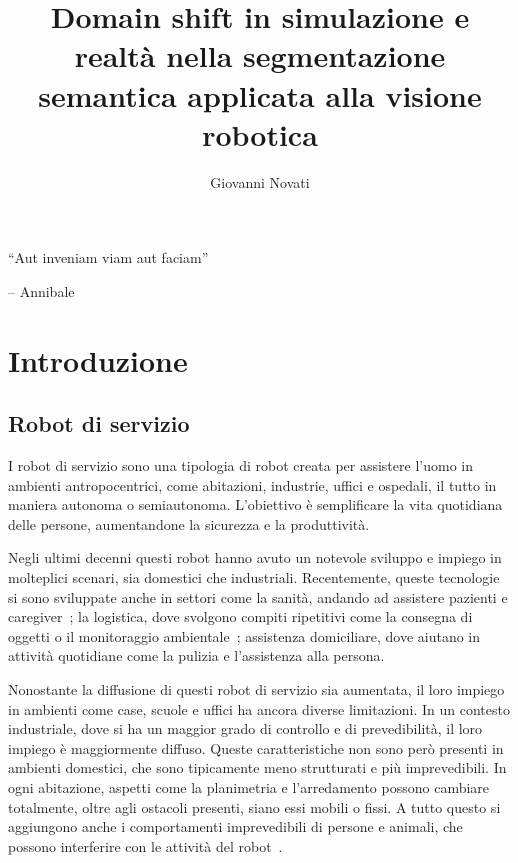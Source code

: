 \documentclass[12pt]{report}
\title{Domain shift in simulazione e realtà nella segmentazione semantica applicata alla visione robotica}
\author{Giovanni Novati}
\begin{document}
\makefrontpage

{\raggedleft \large \sl
	
	\vspace{2cm}
	
	``Aut inveniam viam aut faciam''
	
	\bigskip
	
	\--- Annibale\\}

\beforepreface

\afterpreface

\chapter{Introduzione}
\label{cap:introduzione}

\section{Robot di servizio}
\label{sec:robot_servizio}

I robot di servizio sono una tipologia di robot creata per assistere l'uomo in ambienti antropocentrici, come abitazioni, industrie, uffici e ospedali, il tutto in maniera autonoma o semiautonoma. L'obiettivo è semplificare la vita quotidiana delle persone, aumentandone la sicurezza e la produttività.

Negli ultimi decenni questi robot hanno avuto un notevole sviluppo e impiego in molteplici scenari, sia domestici che industriali. Recentemente, queste tecnologie si sono sviluppate anche in settori come la sanità, andando ad assistere pazienti e caregiver~\cite{robotics10010047}; la logistica, dove svolgono compiti ripetitivi come la consegna di oggetti o il monitoraggio ambientale~\cite{fragapane2021405}; assistenza domiciliare, dove aiutano in attività quotidiane come la pulizia e l'assistenza alla persona.

Nonostante la diffusione di questi robot di servizio sia aumentata, il loro impiego in ambienti come case, scuole e uffici ha ancora diverse limitazioni. In un contesto industriale, dove si ha un maggior grado di controllo e di prevedibilità, il loro impiego è maggiormente diffuso. Queste caratteristiche non sono però presenti in ambienti domestici, che sono tipicamente meno strutturati e più imprevedibili. In ogni abitazione, aspetti come la planimetria e l'arredamento possono cambiare totalmente, oltre agli ostacoli presenti, siano essi mobili o fissi. A tutto questo si aggiungono anche i comportamenti imprevedibili di persone e animali, che possono interferire con le attività del robot~\cite{6301139}.
\end{document}
